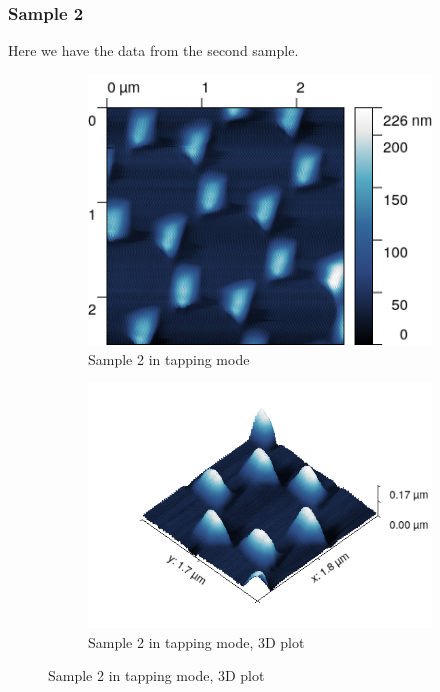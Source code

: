 \documentclass[11pt,a4paper]{article}
\begin{document}
\subsubsection{Sample 2}
Here we have the data from the second sample.
\begin{figure}[H]
\centering
\begin{subfigure}[b]{0.45\textwidth}
\includegraphics[width=\textwidth]{tm_sample2}
\caption{Sample 2 in tapping mode}
\label{fig:}
\end{subfigure}
\begin{subfigure}[b]{0.45\textwidth}
\includegraphics[width=\textwidth]{tm_sample2_3D}
\caption{Sample 2 in tapping mode, 3D plot}
\label{fig:}
\end{subfigure}
\end{figure}
\end{document}
